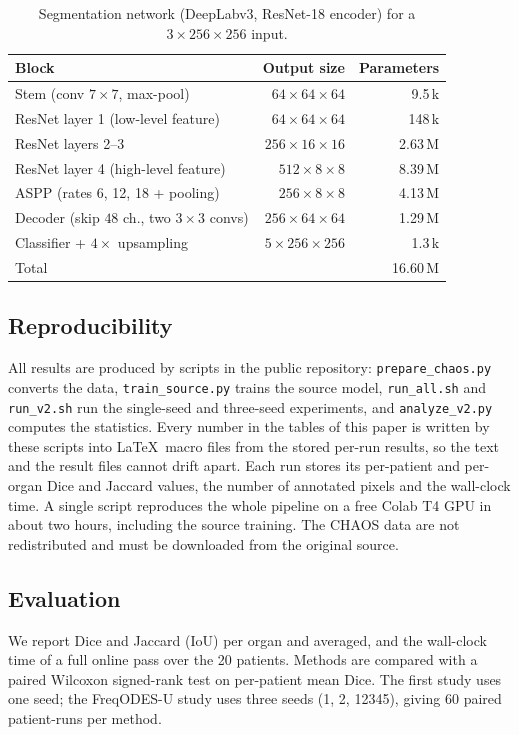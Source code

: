 \documentclass[a4paper,fleqn]{cas-dc}
\begin{document}
\begin{table}[!htbp]
\caption{Segmentation network (DeepLabv3, ResNet-18 encoder) for a $3\times256\times256$ input.}
\label{tab:arch}
\centering\footnotesize
\setlength{\tabcolsep}{3pt}
\begin{tabular}{@{}lrr@{}}
\toprule
Block & Output size & Parameters \\
\midrule
Stem (conv $7\times7$, max-pool) & $64\times64\times64$ & 9.5\,k \\
ResNet layer 1 (low-level feature) & $64\times64\times64$ & 148\,k \\
ResNet layers 2--3 & $256\times16\times16$ & 2.63\,M \\
ResNet layer 4 (high-level feature) & $512\times8\times8$ & 8.39\,M \\
ASPP (rates 6, 12, 18 + pooling) & $256\times8\times8$ & 4.13\,M \\
Decoder (skip $48$ ch., two $3\times3$ convs) & $256\times64\times64$ & 1.29\,M \\
Classifier + $4\times$ upsampling & $5\times256\times256$ & 1.3\,k \\
\midrule
Total & & 16.60\,M \\
\bottomrule
\end{tabular}
\end{table}

\subsection{Reproducibility}
All results are produced by scripts in the public repository: \texttt{prepare\_chaos.py} converts the data, \texttt{train\_source.py} trains the source model, \texttt{run\_all.sh} and \texttt{run\_v2.sh} run the single-seed and three-seed experiments, and \texttt{analyze\_v2.py} computes the statistics. Every number in the tables of this paper is written by these scripts into \LaTeX\ macro files from the stored per-run results, so the text and the result files cannot drift apart. Each run stores its per-patient and per-organ Dice and Jaccard values, the number of annotated pixels and the wall-clock time. A single script reproduces the whole pipeline on a free Colab T4 GPU in about two hours, including the source training. The CHAOS data are not redistributed and must be downloaded from the original source.

\subsection{Evaluation}
We report Dice and Jaccard (IoU) per organ and averaged, and the wall-clock time of a full online pass over the 20 patients. Methods are compared with a paired Wilcoxon signed-rank test on per-patient mean Dice. The first study uses one seed; the FreqODES-U study uses three seeds (1, 2, 12345), giving 60 paired patient-runs per method.
\end{document}
